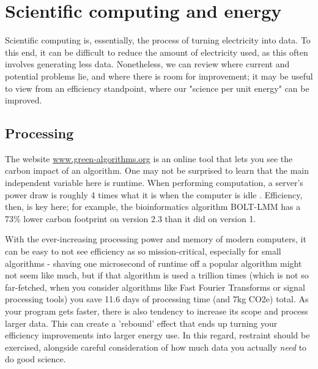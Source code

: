\documentclass{article}
\begin{document}
\section{Scientific computing and energy}
Scientific computing is, essentially, the process of turning electricity into data. To this end, it can be difficult to reduce the amount of electricity used, as this often involves generating less data. Nonetheless, we can review where current and potential problems lie, and where there is room for improvement; it may be useful to view from an efficiency standpoint, where our "science per unit energy" can be improved.


\subsection{Processing}
The website \href{www.green-algorithms.org}{www.green-algorithms.org} \citep{lannelongue2021green} is an online tool that lets you see the carbon impact of an algorithm. One may not be surprised to learn that the main independent variable here is runtime. When performing computation, a server's power draw is roughly 4 times what it is when the computer is idle \citep{lannelongue2021ten}. Efficiency, then, is key here; for example, the bioinformatics algorithm BOLT-LMM has a 73\% lower carbon footprint on version 2.3 than it did on version 1.  \citep{grealey2021carbon} \newline

With the ever-increasing processing power and memory of modern computers, it can be easy to not see efficiency as so mission-critical, especially for small algorithms - shaving one microsecond of runtime off a popular algorithm might not seem like much, but if that algorithm is used a trillion times (which is not so far-fetched, when you consider algorithms like Fast Fourier Transforms or signal processing tools) you save 11.6 days of processing time (and 7kg CO2e) total.  As your program gets faster, there is also tendency to increase its scope and process larger data. This can create a 'rebound' effect \citep{lannelongue2021ten} that ends up turning your efficiency improvements into larger energy use. In this regard, restraint should be exercised, alongside careful consideration of how much data you actually \emph{need} to do good science.\newline
\end{document}
